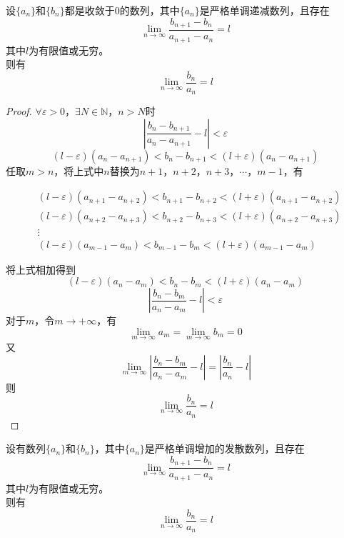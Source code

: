 \begin{proposition}

    设$\{a_n\}$和$\{b_n\}$都是收敛于$0$的数列，其中$\{a_n\}$是严格单调递减数列，且存在
    $$\lim\limits_{n\to\infty}{\dfrac{b_{n+1}- b_n}{a_{n+1}-a_n}} = l $$
    其中$l$为有限值或无穷。\\
    则有
    $$\lim\limits_{n\to\infty}{\dfrac{b_n}{a_n}} = l$$

\end{proposition}

\begin{proof}
    
    $\forall \varepsilon>0$，$\exists N \in \mathbb{N}$，$n > N$时
    $$\left| \dfrac{b_n-b_{n+1}}{a_n-a_{n+1}}-l\right| < \varepsilon$$
    $$(l-\varepsilon)(a_n-a_{n+1})<b_n-b_{n+1}<(l+\varepsilon)(a_n-a_{n+1})$$
    任取$m>n$，将上式中$n$替换为$n+1$，$n+2$，$n+3$，$\cdots$，$m-1$，有

    \begin{align*}
        &(l-\varepsilon)(a_{n+1}-a_{n+2})<b_{n+1}-b_{n+2}<(l+\varepsilon)(a_{n+1}-a_{n+2})\\
        &(l-\varepsilon)(a_{n+2}-a_{n+3})<b_{n+2}-b_{n+3}<(l+\varepsilon)(a_{n+2}-a_{n+3})\\
        &\vdots\\
        &(l-\varepsilon)(a_{m-1}-a_{m})<b_{m-1}-b_{m}<(l+\varepsilon)(a_{m-1}-a_{m})
    \end{align*}

    将上式相加得到
    $$(l-\varepsilon)(a_{n}-a_{m})<b_{n}-b_{m}<(l+\varepsilon)(a_{n}-a_{m})$$
    $$\left| \dfrac{b_n-b_{m}}{a_n-a_{m}}-l\right| < \varepsilon$$
    对于$m$，令$m\to+\infty$，有
    $$\lim\limits_{m\to\infty}{a_m}=\lim\limits_{m\to\infty}{b_m}=0$$
    又
    $$\lim\limits_{m\to\infty}{\left| \dfrac{b_n-b_{m}}{a_n-a_{m}}-l\right|} = \left|\dfrac{b_n}{a_n}-l\right|$$
    则
    $$\lim\limits_{n\to\infty}{\dfrac{b_n}{a_n}} = l$$

\end{proof}

\begin{proposition}
    
    设有数列$\{a_n\}$和$\{b_n\}$，其中$\{a_n\}$是严格单调增加的发散数列，且存在
    $$\lim\limits_{n\to\infty}{\dfrac{b_{n+1}- b_n}{a_{n+1}-a_n}} = l $$
    其中$l$为有限值或无穷。\\
    则有
    $$\lim\limits_{n\to\infty}{\dfrac{b_n}{a_n}} = l$$

\end{proposition}

